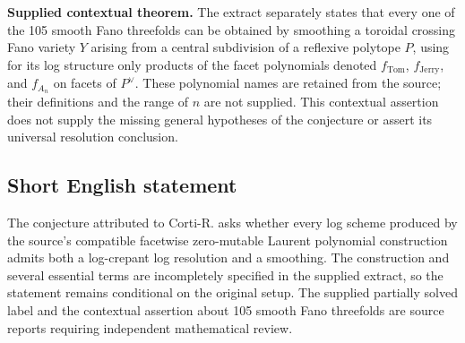 \documentclass[11pt]{article}
\begin{document}
\textbf{Supplied contextual theorem.} The extract separately states that every one of the 105 smooth Fano threefolds can be obtained by smoothing a toroidal crossing Fano variety \(Y\) arising from a central subdivision of a reflexive polytope \(P\), using for its log structure only products of the facet polynomials denoted \(f_{\mathrm{Tom}}\), \(f_{\mathrm{Jerry}}\), and \(f_{A_n}\) on facets of \(P^\vee\). These polynomial names are retained from the source; their definitions and the range of \(n\) are not supplied. This contextual assertion does not supply the missing general hypotheses of the conjecture or assert its universal resolution conclusion.
\subsection{Short English statement}
The conjecture attributed to Corti-R. asks whether every log scheme produced by the source's compatible facetwise zero-mutable Laurent polynomial construction admits both a log-crepant log resolution and a smoothing. The construction and several essential terms are incompletely specified in the supplied extract, so the statement remains conditional on the original setup. The supplied partially solved label and the contextual assertion about 105 smooth Fano threefolds are source reports requiring independent mathematical review.
\end{document}
